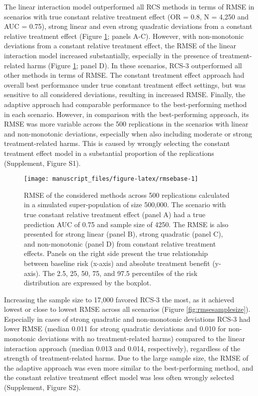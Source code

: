 \documentclass[]{elsarticle} %
\begin{document}
The linear interaction model outperformed all RCS methods in terms of
RMSE in scenarios with true constant relative treatment effect (OR =
0.8, N = 4,250 and AUC = 0.75), strong linear and even strong quadratic
deviations from a constant relative treatment effect (Figure
\ref{fig:rmsebase}; panels A-C). However, with non-monotonic deviations
from a constant relative treatment effect, the RMSE of the linear
interaction model increased substantially, especially in the presence of
treatment-related harms (Figure \ref{fig:rmsebase}; panel D). In these
scenarios, RCS-3 outperformed all other methods in terms of RMSE. The
constant treatment effect approach had overall best performance under
true constant treatment effect settings, but was sensitive to all
considered deviations, resulting in increased RMSE. Finally, the
adaptive approach had comparable performance to the best-performing
method in each scenario. However, in comparison with the best-performing
approach, its RMSE was more variable across the 500 replications in the
scenarios with linear and non-monotonic deviations, especially when also
including moderate or strong treatment-related harms. This is caused by
wrongly selecting the constant treatment effect model in a substantial
proportion of the replications (Supplement, Figure S1).

\begin{figure}
\texttt{[image: manuscript\_files/figure-latex/rmsebase-1]} \caption{RMSE of the considered methods across 500 replications calculated in a simulated super-population of size 500,000. The scenario with true constant relative treatment effect (panel A) had a true prediction AUC of 0.75 and sample size of 4250. The RMSE is also presented for strong linear (panel B), strong quadratic (panel C), and non-monotonic (panel D) from constant relative treatment effects. Panels on the right side present the true relationship between baseline risk (x-axis) and absolute treatment benefit (y-axis). The 2.5, 25, 50, 75, and 97.5 percentiles of the risk distribution are expressed by the boxplot.}\label{fig:rmsebase}
\end{figure}

Increasing the sample size to 17,000 favored RCS-3 the most, as it
achieved lowest or close to lowest RMSE across all scenarios (Figure
\ref{fig:rmsesamplesize}). Especially in cases of strong quadratic and
non-monotonic deviations RCS-3 had lower RMSE (median 0.011 for strong
quadratic deviations and 0.010 for non-monotonic deviations with no
treatment-related harms) compared to the linear interaction approach
(median 0.013 and 0.014, respectively), regardless of the strength of
treatment-related harms. Due to the large sample size, the RMSE of the
adaptive approach was even more similar to the best-performing method,
and the constant relative treatment effect model was less often wrongly
selected (Supplement, Figure S2).
\end{document}
